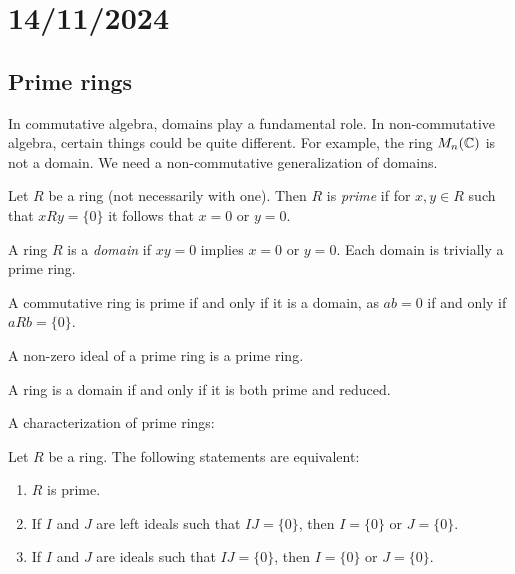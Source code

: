 \section{14/11/2024}

\subsection{Prime rings}

In commutative algebra, domains play a fundamental role. In non-commutative
algebra, certain things could be quite different. 
For example, the ring $M_n(\mathbb{C})$ is not a domain.
We need a non-commutative generalization of domains.

\begin{definition}
	Let $R$ be a ring (not necessarily with one). Then $R$ is
	\emph{prime} if for $x,y\in R$ such that $xRy=\{0\}$ it follows that $x=0$ or 
	$y=0$.
\end{definition}

A ring $R$ is a \emph{domain} if $xy=0$ implies
$x=0$ or $y=0$. Each domain is trivially a prime ring.

\begin{example}
    A commutative ring is prime if and only if it is a domain, as $ab=0$ 
    if and only if $aRb=\{0\}$.
\end{example}

\begin{example}
    A non-zero ideal of a prime ring is a prime ring.
\end{example}

\begin{exercise}
\label{xca:domain<=>prime+reduced}
    A ring is a domain if and only if
    it is both prime and reduced. 
\end{exercise}

A characterization of prime rings:

\begin{proposition}
    Let $R$ be a ring. The following statements are equivalent:
	\begin{enumerate}
		\item $R$ is prime.
		\item If $I$ and $J$ are left ideals such that $IJ=\{0\}$, then 
			$I=\{0\}$ or $J=\{0\}$.
		\item If $I$ and $J$ are ideals such that $IJ=\{0\}$, then $I=\{0\}$ or
			$J=\{0\}$.
	\end{enumerate}
\end{proposition}

